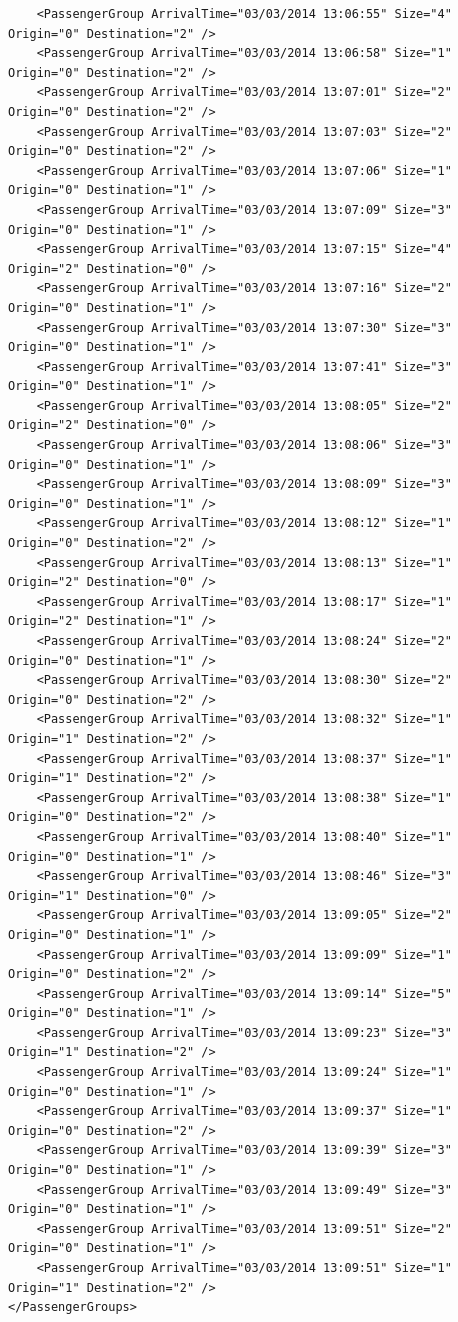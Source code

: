 \documentclass{UoYCSproject}
\begin{document}
\begin{appendices}
\begin{lstlisting}
	<PassengerGroup ArrivalTime="03/03/2014 13:06:55" Size="4" Origin="0" Destination="2" />
	<PassengerGroup ArrivalTime="03/03/2014 13:06:58" Size="1" Origin="0" Destination="2" />
	<PassengerGroup ArrivalTime="03/03/2014 13:07:01" Size="2" Origin="0" Destination="2" />
	<PassengerGroup ArrivalTime="03/03/2014 13:07:03" Size="2" Origin="0" Destination="2" />
	<PassengerGroup ArrivalTime="03/03/2014 13:07:06" Size="1" Origin="0" Destination="1" />
	<PassengerGroup ArrivalTime="03/03/2014 13:07:09" Size="3" Origin="0" Destination="1" />
	<PassengerGroup ArrivalTime="03/03/2014 13:07:15" Size="4" Origin="2" Destination="0" />
	<PassengerGroup ArrivalTime="03/03/2014 13:07:16" Size="2" Origin="0" Destination="1" />
	<PassengerGroup ArrivalTime="03/03/2014 13:07:30" Size="3" Origin="0" Destination="1" />
	<PassengerGroup ArrivalTime="03/03/2014 13:07:41" Size="3" Origin="0" Destination="1" />
	<PassengerGroup ArrivalTime="03/03/2014 13:08:05" Size="2" Origin="2" Destination="0" />
	<PassengerGroup ArrivalTime="03/03/2014 13:08:06" Size="3" Origin="0" Destination="1" />
	<PassengerGroup ArrivalTime="03/03/2014 13:08:09" Size="3" Origin="0" Destination="1" />
	<PassengerGroup ArrivalTime="03/03/2014 13:08:12" Size="1" Origin="0" Destination="2" />
	<PassengerGroup ArrivalTime="03/03/2014 13:08:13" Size="1" Origin="2" Destination="0" />
	<PassengerGroup ArrivalTime="03/03/2014 13:08:17" Size="1" Origin="2" Destination="1" />
	<PassengerGroup ArrivalTime="03/03/2014 13:08:24" Size="2" Origin="0" Destination="1" />
	<PassengerGroup ArrivalTime="03/03/2014 13:08:30" Size="2" Origin="0" Destination="2" />
	<PassengerGroup ArrivalTime="03/03/2014 13:08:32" Size="1" Origin="1" Destination="2" />
	<PassengerGroup ArrivalTime="03/03/2014 13:08:37" Size="1" Origin="1" Destination="2" />
	<PassengerGroup ArrivalTime="03/03/2014 13:08:38" Size="1" Origin="0" Destination="2" />
	<PassengerGroup ArrivalTime="03/03/2014 13:08:40" Size="1" Origin="0" Destination="1" />
	<PassengerGroup ArrivalTime="03/03/2014 13:08:46" Size="3" Origin="1" Destination="0" />
	<PassengerGroup ArrivalTime="03/03/2014 13:09:05" Size="2" Origin="0" Destination="1" />
	<PassengerGroup ArrivalTime="03/03/2014 13:09:09" Size="1" Origin="0" Destination="2" />
	<PassengerGroup ArrivalTime="03/03/2014 13:09:14" Size="5" Origin="0" Destination="1" />
	<PassengerGroup ArrivalTime="03/03/2014 13:09:23" Size="3" Origin="1" Destination="2" />
	<PassengerGroup ArrivalTime="03/03/2014 13:09:24" Size="1" Origin="0" Destination="1" />
	<PassengerGroup ArrivalTime="03/03/2014 13:09:37" Size="1" Origin="0" Destination="2" />
	<PassengerGroup ArrivalTime="03/03/2014 13:09:39" Size="3" Origin="0" Destination="1" />
	<PassengerGroup ArrivalTime="03/03/2014 13:09:49" Size="3" Origin="0" Destination="1" />
	<PassengerGroup ArrivalTime="03/03/2014 13:09:51" Size="2" Origin="0" Destination="1" />
	<PassengerGroup ArrivalTime="03/03/2014 13:09:51" Size="1" Origin="1" Destination="2" />
</PassengerGroups>
\end{lstlisting}


\end{appendices}
\end{document}
